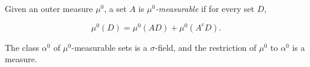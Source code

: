 Given an outer measure $\mu^0$, a set $A$ is \textit{$\mu^0$-measurable} if for every set $D$,

$$\mu^0(D) = \mu^0(AD) + \mu^0(A^c D).$$

The class $\alpha^0$ of $\mu^0$-measurable sets is a $\sigma$-field, and the restriction of $\mu^0$ to $\alpha^0$ is a measure.
